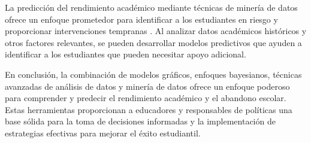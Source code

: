 La predicción del rendimiento académico mediante técnicas de minería de datos ofrece un enfoque prometedor para identificar a los estudiantes en riesgo
y proporcionar intervenciones tempranas \cite{garcia2018prediccion, wang2017literature}. Al analizar datos académicos históricos y otros factores relevantes,
se pueden desarrollar modelos predictivos que ayuden a identificar a los estudiantes que pueden necesitar apoyo adicional.

En conclusión, la combinación de modelos gráficos, enfoques bayesianos, técnicas avanzadas de análisis de datos y minería de datos ofrece un enfoque poderoso
para comprender y predecir el rendimiento académico y el abandono escolar. Estas herramientas proporcionan a educadores y responsables de políticas una base
sólida para la toma de decisiones informadas y la implementación de estrategias efectivas para mejorar el éxito estudiantil.
